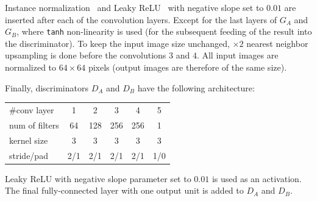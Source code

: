 Instance normalization~\citep{UlyanovVL17} and Leaky ReLU~\citep{HeZRS15} with negative slope set to $0.01$ are inserted after each of the convolution layers. Except for the last layers of $G_A$ and $G_B$, where \texttt{tanh} non-linearity is used (for the subsequent feeding of the result into the discriminator). To keep the input image size unchanged,  $\times 2$ nearest neighbor upsampling is done before the convolutions $3$ and $4$.
All input images are normalized to $64\times64$ pixels (output images are therefore of the same size). 




Finally, discriminators $D_A$ and $D_B$ have the following architecture: 
\begin{center}
\begin{scriptsize}
\begin{tabular}{l |c c c c c }
\hline
  \#conv layer      &1      &2    &3     &4    &5  \\
  num of filters    &64     &128  &256   &256  &1  \\
  kernel size       &3      &3    &3     & 3   &3  \\
  stride/pad        &2/1    &2/1  &2/1   &2/1  &1/0\\
\hline
\end{tabular}
\end{scriptsize}
\end{center}
\vspace{0.5em}
Leaky ReLU \citep{HeZRS15} with negative slope parameter set to $0.01$ is used as an activation. The final fully-connected layer with one output unit is added to $D_A$ and $D_B$.


